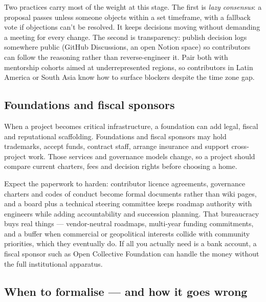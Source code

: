 Two practices carry most of the weight at this stage. The first is \emph{lazy consensus}: a proposal passes unless someone objects within a set timeframe, with a fallback vote if objections can't be resolved. It keeps decisions moving without demanding a meeting for every change. The second is transparency: publish decision logs somewhere public (GitHub Discussions, an open Notion space) so contributors can follow the reasoning rather than reverse-engineer it. Pair both with mentorship cohorts aimed at underrepresented regions, so contributors in Latin America or South Asia know how to surface blockers despite the time zone gap.



\subsection{Foundations and fiscal sponsors}


When a project becomes critical infrastructure, a foundation can add legal, fiscal and reputational scaffolding. Foundations and fiscal sponsors may hold trademarks, accept funds, contract staff, arrange insurance and support cross-project work. Those services and governance models change, so a project should compare current charters, fees and decision rights before choosing a home.


Expect the paperwork to harden: contributor licence agreements, governance charters and codes of conduct become formal documents rather than wiki pages, and a board plus a technical steering committee keeps roadmap authority with engineers while adding accountability and succession planning. That bureaucracy buys real things — vendor-neutral roadmaps, multi-year funding commitments, and a buffer when commercial or geopolitical interests collide with community priorities, which they eventually do. If all you actually need is a bank account, a fiscal sponsor such as Open Collective Foundation can handle the money without the full institutional apparatus.



\subsection{When to formalise — and how it goes wrong}


